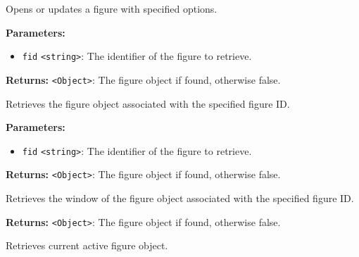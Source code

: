 \documentclass[12pt,a4paper]{article}
\begin{document}
\noindent Opens or updates a figure with specified options.

\vspace{5mm}
\noindent {}


\noindent \textbf{Parameters:}
\begin{itemize}
  \item \texttt{fid} \texttt{<string>}: The identifier of the figure to retrieve.
\end{itemize}

\noindent \textbf{Returns:} \texttt{<Object>}: The figure object if found, otherwise \textasciigrave{}false\textasciigrave{}.

\noindent Retrieves the figure object associated with the specified figure ID.

\vspace{5mm}
\noindent {}


\noindent \textbf{Parameters:}
\begin{itemize}
  \item \texttt{fid} \texttt{<string>}: The identifier of the figure to retrieve.
\end{itemize}

\noindent \textbf{Returns:} \texttt{<Object>}: The figure object if found, otherwise \textasciigrave{}false\textasciigrave{}.

\noindent Retrieves the window of the figure object associated with the specified figure ID.

\vspace{5mm}
\noindent {}


\noindent \textbf{Returns:} \texttt{<Object>}: The figure object if found, otherwise \textasciigrave{}false\textasciigrave{}.

\noindent Retrieves current active figure object.

\vspace{5mm}
\noindent {}
\end{document}
